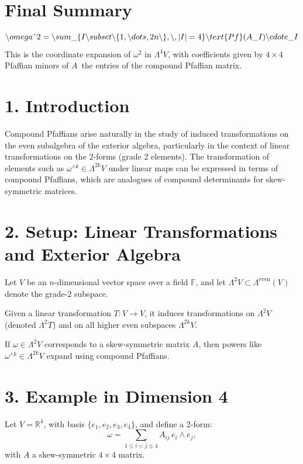 \documentclass[aps,prd,onecolumn,notitlepage,nofootinbib]{revtex4-2}
\begin{document}
\section{Final Summary}

\begin{equation*}
\backslash omega\symbol{94}2=\backslash sum\_\{I\backslash subset\backslash
\{1,\backslash dots,2n\backslash \},\backslash ,|I|=4\}\backslash
text\{Pf\}(A\_I)\backslash cdote\_I
\end{equation*}%
This is the coordinate expansion of $\omega ^{2}$ in $\Lambda ^{4}V$, with
coefficients given by $4\times 4$ Pfaffian minors of $A$\ the entries of the
compound Pfaffian matrix.

\section*{1. Introduction}

Compound Pfaffians arise naturally in the study of induced transformations
on the even subalgebra of the exterior algebra, particularly in the context
of linear transformations on the 2-forms (grade 2 elements). The
transformation of elements such as $\omega^{\wedge k} \in \Lambda^{2k} V $
under linear maps can be expressed in terms of compound Pfaffians, which are
analogues of compound determinants for skew-symmetric matrices.

\section*{2. Setup: Linear Transformations and Exterior Algebra}

Let $V$ be an $n$-dimensional vector space over a field $\mathbb{F}$, and
let $\Lambda ^{2}V\subset \Lambda ^{\text{even}}(V)$ denote the grade-2
subspace.

Given a linear transformation $T: V \to V $, it induces transformations on $%
\Lambda^2 V $ (denoted $\Lambda^2 T $) and on all higher even subspaces $%
\Lambda^{2k} V $.

If $\omega \in \Lambda^2 V $ corresponds to a skew-symmetric matrix $A $,
then powers like $\omega^{\wedge k} \in \Lambda^{2k} V $ expand using
compound Pfaffians.

\section*{3. Example in Dimension 4}

Let $V = \mathbb{R}^4 $, with basis $\{e_1, e_2, e_3, e_4\} $, and define a
2-form: 
\begin{equation}
\omega = \sum_{1 \le i < j \le 4} A_{ij} \, e_i \wedge e_j,
\end{equation}
with $A $ a skew-symmetric $4 \times 4 $ matrix.
\end{document}
